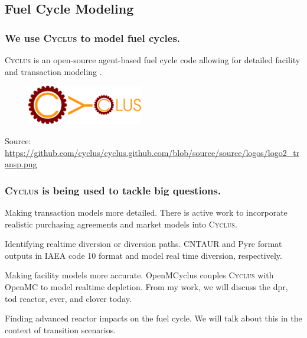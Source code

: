 \documentclass[9pt]{beamer}
\newcommand{\cyclus}{\textsc{Cyclus}\xspace}
\begin{document}
\subsection{Fuel Cycle Modeling}
  \begin{frame}
    \frametitle{We use \cyclus to model fuel cycles.}
    \vspace{20pt}
    \cyclus is an open-source agent-based fuel cycle code allowing for detailed facility and transaction modeling \cite{huff_fundamental_2016}.
    \vspace{20pt}
    \begin{figure}
        \centering
        \includegraphics[width=0.45\textwidth]{images/cyclus_logo.png}
    \end{figure}

    \vspace{37pt}
    Source: \url{https://github.com/cyclus/cyclus.github.com/blob/source/source/logos/logo2_transp.png}
  \end{frame}

  \begin{frame}
    \frametitle{\cyclus is being used to tackle big questions.}
    \begin{block}{Making transaction models more detailed.}
        There is active work to incorporate realistic purchasing agreements and market models into \cyclus.
    \end{block}
    \begin{block}{Identifying realtime diversion or diversion paths.}
        CNTAUR \cite{mummah_advanced_2024} and Pyre \cite{westphal_modeling_2019} format outputs in IAEA code 10 format and model real time diversion, respectively.
    \end{block}
    \begin{block}{Making facility models more accurate.}
      OpenMCyclus \cite{openmcyclus_paper} couples \cyclus with OpenMC to model realtime depletion. From my work, we will discuss the \gls{dpr}, \gls{tod} reactor, \gls{ever}, and \gls{clover} today.
  \end{block}
    \begin{block}{Finding advanced reactor impacts on the fuel cycle.}
        We will talk about this in the context of transition scenarios.
    \end{block}
  \end{frame}
\end{document}
